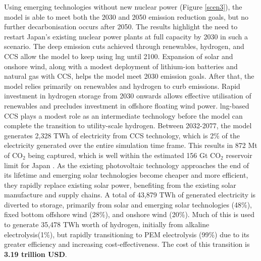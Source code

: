 Using emerging technologies without new nuclear power (Figure \ref{scen3}), the model is able to meet both the 2030 and 2050 emission reduction goals, but no further decarbonisation occurs after 2050. The results highlight the need to restart Japan's existing nuclear power plants at full capacity by 2030 in such a scenario. The deep emission cuts achieved through renewables, hydrogen, and \gls{CCS} allow the model to keep using \gls{lng} until 2100. Expansion of solar and onshore wind, along with a modest deployment of lithium-ion batteries and natural gas with \gls{CCS}, helps the model meet 2030 emission goals. After that, the model relies primarily on renewables and hydrogen to curb emissions. Rapid investment in hydrogen storage from 2030 onwards allows effective utilisation of renewables and precludes investment in offshore floating wind power. \gls{lng}-based \gls{CCS} plays a modest role as an intermediate technology before the model can complete the transition to utility-scale hydrogen. Between 2032-2077, the model generates 2,328 TWh  of electricity from \gls{CCS} technology, which is 2\% of the electricity generated over the entire simulation time frame. This results in 872 Mt of CO$_2$ being captured, which is well within the estimated 156 Gt CO$_2$ reservoir limit for Japan \cite{kato_energy_2016}. As the existing photovoltaic technology approaches the end of its lifetime and emerging solar technologies become cheaper and more efficient, they rapidly replace existing solar power, benefiting from the existing solar manufacture and supply chains. A total of 43,879 TWh of generated electricity is diverted to storage, primarily from solar and emerging solar technologies (48\%), fixed bottom offshore wind (28\%), and onshore wind (20\%). Much of this is used to generate 35,478 TWh worth of hydrogen, initially from alkaline electrolysis(1\%), but rapidly transitioning to PEM electrolysis (99\%) due to its greater efficiency and increasing cost-effectiveness. The cost of this transition is \textbf{3.19 trillion USD}.

